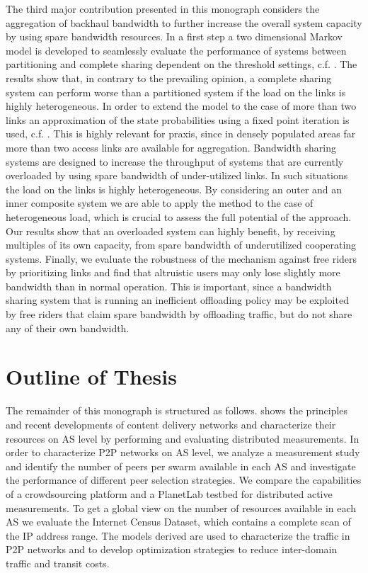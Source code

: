 The third major contribution presented in this monograph considers the aggregation of backhaul bandwidth to further increase the overall system capacity by using spare bandwidth resources.
In a first step a two dimensional Markov model is developed to seamlessly evaluate the performance of systems between partitioning and complete sharing dependent on the threshold settings, c.f. \cite{burger2016phycom}.
The results show that, in contrary to the prevailing opinion, a complete sharing system can perform worse than a partitioned system if the load on the links is highly heterogeneous.
In order to extend the model to the case of more than two links an approximation of the state probabilities using a fixed point iteration is used, c.f. \cite{burger2017im}.
This is highly relevant for praxis, since in densely populated areas far more than two access links are available for aggregation.
Bandwidth sharing systems are designed to increase the throughput of systems that are currently overloaded by using spare bandwidth of under-utilized links.
In such situations the load on the links is highly heterogeneous.
By considering an outer and an inner composite system we are able to apply the method to the case of heterogeneous load, which is crucial to assess the full potential of the approach.
Our results show that an overloaded system can highly benefit, by receiving multiples of its own capacity, from spare bandwidth of underutilized cooperating systems.
Finally, we evaluate the robustness of the mechanism against free riders by prioritizing links and find that altruistic users may only lose slightly more bandwidth than in normal operation.
This is important, since a bandwidth sharing system that is running an inefficient offloading policy may be exploited by free riders that claim spare bandwidth by offloading traffic, but do not share any of their own bandwidth.


\section{Outline of Thesis}\label{sec:introduction:outline}

The remainder of this monograph is structured as follows.
 shows the principles and recent developments of content delivery networks and characterize their resources on AS level by performing and evaluating distributed measurements.
In order to characterize P2P networks on AS level, we analyze a measurement study and identify the number of peers per swarm available in each AS and investigate the performance of different peer selection strategies.
We compare the capabilities of a crowdsourcing platform and a PlanetLab testbed for distributed active measurements.
To get a global view on the number of resources available in each AS we evaluate the Internet Census Dataset, which contains a complete scan of the IP address range.
The models derived are used to characterize the traffic in P2P networks and to develop optimization strategies to reduce inter-domain traffic and transit costs.

